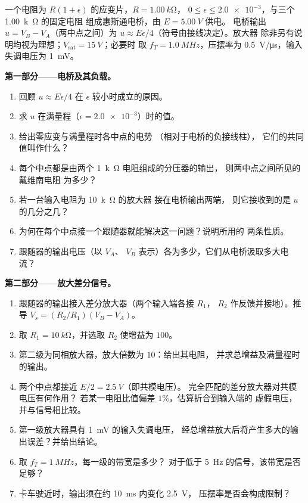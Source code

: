 \begin{problem}
\label{pb:b1:operational-amplifier:1}
一个电阻为 $R(1 + \epsilon)$ 的应变片，$R = \qty{1.00}{k\ohm}$，
$0 \leq \epsilon \leq \num{2.0e-3}$，与三个 \qty{1.00}{k\ohm} 的固定电阻
组成惠斯通电桥，由 $E = \qty{5.00}{V}$ 供电。
电桥输出 $u = V_B - V_A$（两中点之间）为
$u \approx E\epsilon/4$（符号由接线决定）。放大器
除非另有说明均视为理想；$V_{\mathrm{sat}} = \qty{15}{V}$；必要时
取 $f_T = \qty{1.0}{MHz}$，压摆率为 \qty{0.5}{V/\micro s}，输入失调电压为
\qty{1}{mV}。

\medskip
\noindent\textbf{第一部分——电桥及其负载。}
\begin{enumerate}
  \item 回顾 $u \approx E\epsilon/4$ 在 $\epsilon$ 较小时成立的原因。
  \item 求 $u$ 在满量程（$\epsilon = \num{2.0e-3}$）时的值。
  \item 给出零应变与满量程时各中点的电势
        （相对于电桥的负接线柱），
        它们的共同值叫作什么？
  \item 每个中点都是由两个 \qty{1}{k\ohm} 电阻组成的分压器的输出，
        则两中点之间所见的戴维南电阻
        为多少？
  \item 若一台输入电阻为 \qty{10}{k\ohm} 的放大器
        接在电桥输出两端，
        则它接收到的是 $u$ 的几分之几？
  \item 为何在每个中点接一个跟随器就能解决这一问题？说明所用的
        两条性质。
  \item 跟随器的输出电压（以 $V_A$、
        $V_B$ 表示）各为多少，它们从电桥汲取多大电流？
\end{enumerate}

\medskip
\noindent\textbf{第二部分——放大差分信号。}
\begin{enumerate}[resume]
  \item 跟随器的输出接入差分放大器（两个输入端各接 $R_1$，
        $R_2$ 作反馈并接地）。推导 $V_s =
        (R_2/R_1)(V_B - V_A)$。
  \item 取 $R_1 = \qty{10}{k\ohm}$，并选取 $R_2$ 使增益为 $100$。
  \item 第二级为同相放大器，放大倍数为 $10$：给出其电阻，
        并求总增益及满量程时的输出。
  \item 两个中点都接近 $E/2 = \qty{2.5}{V}$（即共模电压）。
        完全匹配的差分放大器对共模电压有何作用？
        若某一电阻比值偏差 $1\%$，估算折合到输入端的
        虚假电压，并与信号相比较。
  \item 第一级放大器具有 \qty{1}{mV} 的输入失调电压，
        经总增益放大后将产生多大的输出误差？并给出结论。
  \item 取 $f_T = \qty{1}{MHz}$，每一级的带宽是多少？
        对于低于 \qty{5}{Hz} 的信号，该带宽是否足够？
  \item 卡车驶近时，输出须在约 \qty{10}{ms} 内变化 \qty{2.5}{V}，
        压摆率是否会构成限制？
\end{enumerate}


\end{problem}
